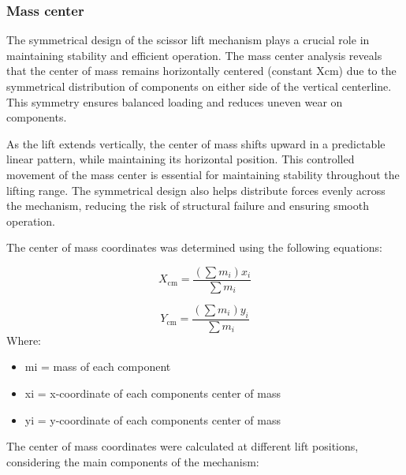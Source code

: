 \documentclass[../../main]{subfiles}
\begin{document}
\subsubsection{Mass center}

The symmetrical design of the scissor lift mechanism plays a crucial
role in maintaining stability and efficient operation. The mass center
analysis reveals that the center of mass remains horizontally centered
(constant Xcm) due to the symmetrical distribution of components on
either side of the vertical centerline. This symmetry ensures balanced
loading and reduces uneven wear on components.

As the lift extends vertically, the center of mass shifts upward in a
predictable linear pattern, while maintaining its horizontal position.
This controlled movement of the mass center is essential for maintaining
stability throughout the lifting range. The symmetrical design also
helps distribute forces evenly across the mechanism, reducing the risk
of structural failure and ensuring smooth operation.

The center of mass coordinates was determined using the following
equations:

\begin{equation}
  X_{\text{cm}} = \frac{\left(\sum m_i\right) x_i}{\sum m_i}
\end{equation}

\begin{equation}
  Y_{\text{cm}} = \frac{\left(\sum m_i\right) y_i}{\sum m_i}
\end{equation}
Where:

\begin{itemize}
\item
  mi = mass of each component
\item
  xi = x-coordinate of each component\textquotesingle s center of mass
\item
  yi = y-coordinate of each component\textquotesingle s center of mass
\end{itemize}

The center of mass coordinates were calculated at different lift
positions, considering the main components of the mechanism:
\end{document}

